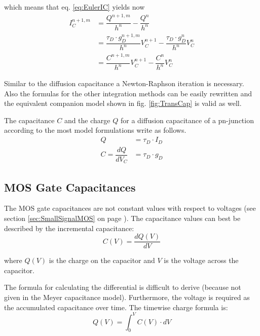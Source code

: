 which means that eq. \eqref{eq:EulerIC} yields now
\begin{equation}
\begin{split}
I_C^{n+1,m} &= \dfrac{Q^{n+1,m}}{h^{n}} - \dfrac{Q^{n}}{h^{n}}\\
&= \dfrac{\tau_D\cdot g_D^{n+1,m}}{h^{n}} V_C^{n+1} - \dfrac{\tau_D\cdot g_D^{n}}{h^{n}} V_C^{n}\\
&= \dfrac{C^{n+1,m}}{h^{n}} V_C^{n+1} - \dfrac{C^{n}}{h^{n}} V_C^{n}
\end{split}
\end{equation}

Similar to the diffusion capacitance a Newton-Raphson iteration is
necessary.  Also the formulas for the other integration methods can be
easily rewritten and the equivalent companion model shown in
fig. \ref{fig:TransCap} is valid as well.

\addvspace{12pt}

The capacitance $C$ and the charge $Q$ for a diffusion capacitance of
a pn-junction according to the most model formulations write as
follows.
\begin{align}
Q &= \tau_D\cdot I_D\\
C = \dfrac{d Q}{d V_C} &= \tau_D\cdot g_D
\end{align}

\subsection{MOS Gate Capacitances}

The MOS gate capacitances are not constant values with respect to
voltages (see section \ref{sec:SmallSignalMOS} on page
\pageref{sec:SmallSignalMOS}). The capacitance values can best be
described by the incremental capacitance:
\begin{equation}
C(V) = \dfrac{d Q(V)}{d V}
\end{equation}

where $Q(V)$ is the charge on the capacitor and $V$ is the voltage
across the capacitor.

\addvspace{12pt}

The formula for calculating the differential is difficult to derive
(because not given in the Meyer capacitance model).  Furthermore, the
voltage is required as the accumulated capacitance over time.  The
timewise charge formula is:
\begin{equation}
Q(V) = \int^{V}_{0} C(V)\cdot dV
\end{equation}


